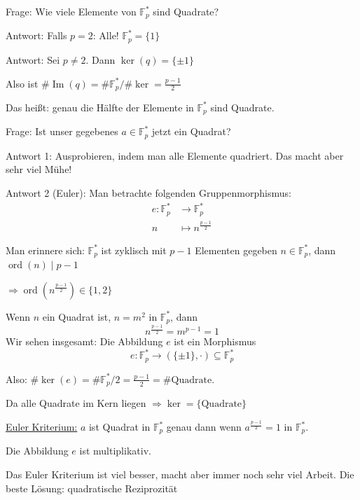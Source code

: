 \documentclass[a4paper,12pt,numbers=noenddot,parskip=full]{scrartcl}
\newcommand{\heading}{\underline}
\theoremstyle{dotless}
\theoremstyle{remark}
\begin{document}
	Frage: Wie viele Elemente von $\mathbb{F}_p^*$ sind Quadrate?
	
	Antwort: Falls $p = 2$: Alle! $\mathbb{F}_p^* = \{ 1 \}$
	
	Antwort: Sei $p \neq 2$. Dann $\ker(q) = \{ \pm 1 \}$
	
	Also ist $\# \operatorname{Im}(q) = \#\mathbb{F}_p^* / \#\ker = \frac{p-1}{2}$
	
	Das heißt: genau die Hälfte der Elemente in $\mathbb{F}_p^*$ sind Quadrate.
	
	Frage: Ist unser gegebenes $a \in \mathbb{F}_p^*$ jetzt ein Quadrat?
	
	Antwort 1: Ausprobieren, indem man alle Elemente quadriert. Das macht aber sehr viel Mühe!
	
	Antwort 2 (Euler): Man betrachte folgenden Gruppenmorphismus:
	\begin{align*}
		e: \mathbb{F}_p^* &\longrightarrow \mathbb{F}_p^* \\
		n &\longmapsto n^{\frac{p-1}{2}}
	\end{align*}
	
	Man erinnere sich: $\mathbb{F}_p^*$ ist zyklisch mit $p-1$ Elementen gegeben $n \in \mathbb{F}_p^*$, dann $\operatorname{ord}(n) \mid p-1$
	
	$\Rightarrow \operatorname{ord}(n^{\frac{p-1}{2}}) \in \{ 1, 2 \}$
	
	Wenn $n$ ein Quadrat ist, $n = m^2$ in $\mathbb{F}_p^*$, dann
	\begin{equation*}
		n^{\frac{p-1}{2}} = m^{p-1} = 1
	\end{equation*}
	Wir sehen insgesamt: Die Abbildung $e$ ist ein Morphismus
	\begin{equation*}
		e: \mathbb{F}_p^* \longrightarrow (\{ \pm 1 \}, \cdot) \subseteq \mathbb{F}_p^*
	\end{equation*}
	
	Also: $\# \ker(e) = \# \mathbb{F}_p^* / 2 = \frac{p-1}{2} = \# \text{Quadrate}$.
	
	Da alle Quadrate im Kern liegen $\Rightarrow \ker = \{ \text{Quadrate} \}$
	
	\heading{Euler Kriterium:} $a$ ist Quadrat in $\mathbb{F}_p^*$ genau dann wenn $a^{\frac{p-1}{2}} = 1$ in $\mathbb{F}_p^*$.
	
	Die Abbildung $e$ ist multiplikativ.
	
	Das Euler Kriterium ist viel besser, macht aber immer noch sehr viel Arbeit. Die beste Lösung: quadratische Reziprozität
	
\end{document}
